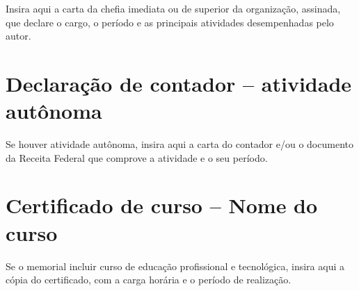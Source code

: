 \documentclass[memorial,capa]{texifsap}
\begin{document}
Insira aqui a carta da chefia imediata ou de superior da organização,
assinada, que declare o cargo, o período e as principais atividades
desempenhadas pelo autor.

\chapter{Declaração de contador -- atividade autônoma}
\label{anx:contador}

Se houver atividade autônoma, insira aqui a carta do contador e/ou o
documento da Receita Federal que comprove a atividade e o seu período.

\chapter{Certificado de curso -- Nome do curso}
\label{anx:certificado}

Se o memorial incluir curso de educação profissional e tecnológica,
insira aqui a cópia do certificado, com a carga horária e o período de
realização.
\end{document}

